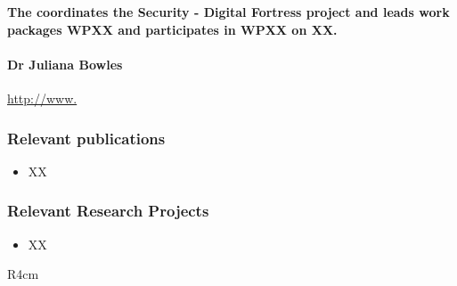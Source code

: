 \documentclass[a4paper,11pt]{article}
\newcommand{\project}[1]{\textbf{#1}\xspace}
\newcommand{\SECURITY}{\project{Security - Digital Fortress}}
\newcommand{\TheProject}{\SECURITY}
\begin{document}
\vspace{10pt}
\textbf{The \SAlong{} coordinates the \TheProject{} project and
leads work packages WPXX and participates in WPXX on XX.}
\vspace{10pt}

\paragraph{Dr Juliana Bowles} \url{http://www.}


\subsubsection*{Relevant publications}
\begin{itemize}
\item XX
\end{itemize}

\pagebreak
\subsubsection*{Relevant Research Projects}

\begin{itemize}
\item XX
\end{itemize}



\begin{wrapfigure}{R}{4cm}
\vspace{-2cm}
\hfill {}
\vspace{-1cm}
\end{wrapfigure}

\ 
\end{document}
